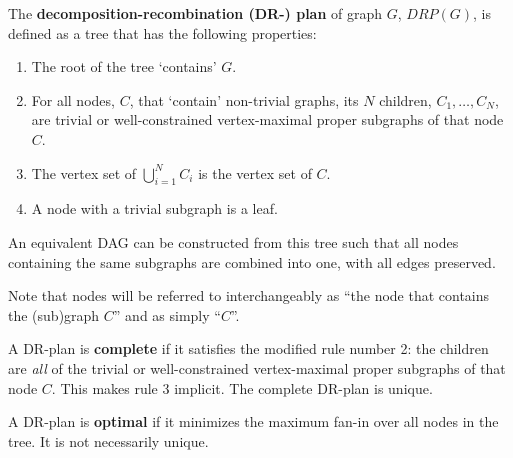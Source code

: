 \begin{definition}\label{def:drp}
    The \textbf{decomposition-recombination \mbox{(DR-)} plan} of graph $G$, $DRP(G)$, is defined as a tree that has the following properties:
    \begin{enumerate}
        \item The root of the tree `contains' $G$.
        \item For all nodes, $C$, that `contain' non-trivial graphs, its $N$ children, $C_1, \ldots, C_N$, are trivial or well-constrained vertex-maximal proper subgraphs of that node $C$.
        \item The vertex set of $\bigcup_{i=1}^N{C_i}$ is the vertex set of $C$.
        \item A node with a trivial subgraph is a leaf.
    \end{enumerate}


    An equivalent DAG can be constructed from this tree such that all nodes containing the same subgraphs are combined into one, with all edges preserved.

    Note that nodes will be referred to interchangeably as ``the node that contains the (sub)graph $C$'' and as simply ``$C$''.

    A DR-plan is \textbf{complete} if it satisfies the modified rule number 2: the children are \emph{all} of the trivial or well-constrained vertex-maximal proper subgraphs of that node $C$. This makes rule 3 implicit. The complete DR-plan is unique.

    A DR-plan is \textbf{optimal} if it minimizes the maximum fan-in over all nodes in the tree. It is not necessarily unique.
\end{definition}




